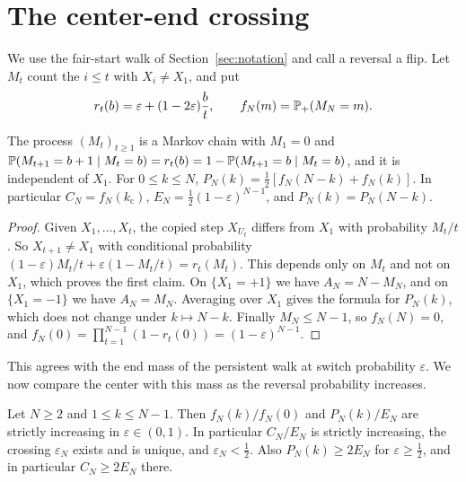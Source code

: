 \section{The center-end crossing}\label{sec:erw}

We use the fair-start walk of Section~\ref{sec:notation} and call a
reversal a flip. Let $M_t$ count the
$i\le t$ with $X_i\ne X_1$, and put
\[
 r_t(b)=\varepsilon+(1-2\varepsilon)\frac bt,\qquad f_N(m)=\mathbb{P}_+(M_N=m).
\]

\begin{lemma}\label{lem:erw-reduction}
The process $(M_t)_{t\ge1}$ is a Markov chain with $M_1=0$ and
$\mathbb{P}(M_{t+1}=b+1\mid M_t=b)=r_t(b)=1-\mathbb{P}(M_{t+1}=b\mid M_t=b)$, and it
is independent of $X_1$. For $0\le k\le N$,
$P_N(k)=\frac12[f_N(N-k)+f_N(k)]$. In particular $C_N=f_N({k_{\mathrm c}})$,
$E_N=\frac12(1-\varepsilon)^{N-1}$, and $P_N(k)=P_N(N-k)$.
\end{lemma}

\begin{proof}
Given $X_1,\dots,X_t$, the copied step $X_{U_t}$ differs from $X_1$ with
probability $M_t/t$. So $X_{t+1}\ne X_1$ with conditional probability
$(1-\varepsilon)M_t/t+\varepsilon(1-M_t/t)=r_t(M_t)$. This depends only on
$M_t$ and not on $X_1$, which proves the first claim. On $\{X_1=+1\}$ we
have $A_N=N-M_N$, and on $\{X_1=-1\}$ we have $A_N=M_N$. Averaging over
$X_1$ gives the formula for $P_N(k)$, which does not change under
$k\mapsto N-k$. Finally $M_N\le N-1$, so $f_N(N)=0$, and
$f_N(0)=\prod_{t=1}^{N-1}(1-r_t(0))=(1-\varepsilon)^{N-1}$.
\end{proof}

This agrees with the end mass of the persistent walk at switch
probability $\varepsilon$. We now compare the center with this mass
as the reversal probability increases.

\begin{proposition}\label{prop:mlr}
Let $N\ge2$ and $1\le k\le N-1$. Then $f_N(k)/f_N(0)$ and $P_N(k)/E_N$ are
strictly increasing in $\varepsilon\in(0,1)$. In particular $C_N/E_N$ is
strictly increasing, the crossing $\varepsilon_N$ exists and is unique, and
$\varepsilon_N<\frac12$. Also $P_N(k)\ge2E_N$ for $\varepsilon\ge\frac12$, and in
particular $C_N\ge2E_N$ there.
\end{proposition}

